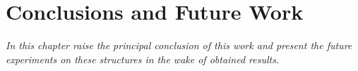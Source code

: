 \chapter{Conclusions and Future Work }
\label{chap:Intro}
\textit{In this chapter raise the principal conclusion of this work and present the future experiments on these structures in the wake of obtained results.}
\vfill
\minitoc
\newpage

\allowdisplaybreaks

